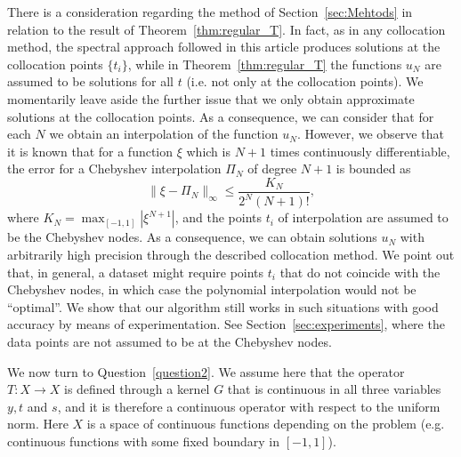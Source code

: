 \documentclass[11pt,fleqn]{amsart} %
\begin{document}
	There is a consideration regarding the method of Section~\ref{sec:Mehtods} in relation to the result of Theorem~\ref{thm:regular_T}. In fact, as in any collocation method, the spectral approach followed in this article produces solutions at the collocation points $\{t_i\}$, while in Theorem~\ref{thm:regular_T} the functions $u_N$ are assumed to be solutions for all $t$ (i.e. not only at the collocation points). We momentarily leave aside the further issue that we only obtain approximate solutions at the collocation points. As a consequence, we can consider that for each $N$ we obtain an interpolation of the function $u_N$. However, we observe that it is known that for a function $\xi$ which is $N+1$ times continuously differentiable, the error for a Chebyshev interpolation $\Pi_N$ of degree $N+1$ is bounded as
	$$
	\|\xi - \Pi_N\|_\infty \leq \frac{K_N}{2^N(N+1)!},
	$$
	where $K_N = \max_{[-1,1]} |\xi^{N+1}|$, and the points $t_i$ of interpolation are assumed to be the Chebyshev nodes. As a consequence, we can obtain solutions $u_N$ with arbitrarily high precision through the described collocation method. We point out that, in general, a dataset might require points $t_i$ that do not coincide with the Chebyshev nodes, in which case the polynomial interpolation would not be ``optimal''. We show that our algorithm still works in such situations with good accuracy by means of experimentation. See Section~\ref{sec:experiments}, where  the data points are not assumed to be at the Chebyshev nodes.
	
	We now turn to Question~\ref{question2}. We assume here that the operator $T:  X\longrightarrow X$ is defined through a kernel $G$ that is continuous in all three variables $y, t$ and $s$, and it is therefore a continuous operator with respect to the uniform norm. Here $X$ is a space of continuous functions depending on the problem (e.g. continuous functions with some fixed boundary in $[-1,1]$).
	
\end{document}
